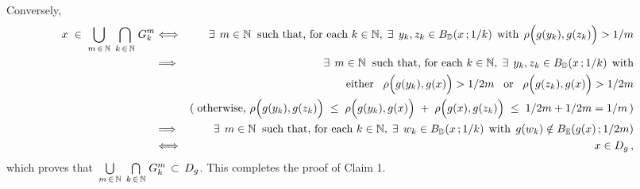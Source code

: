 \vskip 0.3cm
\noindent
Conversely,
\begin{eqnarray*}
x \;\in\; \underset{m\,\in\,\N}{\bigcup}\;\, \underset{k\,\in\,\N}{\bigcap}\; G^{m}_{k}
&\Longleftrightarrow&
	\exists\;\,m \in \N \;\;\textnormal{such that, for each $k \in \N$},\;
	\exists\;\, y_{k}, z_{k} \in B_{\D}(x\,;1/k)\;\,\textnormal{with}\;\, \rho\!\left(g(y_{k})\overset{{\color{white}\vert}}{,}\,g(z_{k})\right) > 1/m
\\
&\Longrightarrow&
	\exists\;\,m \in \N \;\;\textnormal{such that, for each $k \in \N$},\;
	\exists\;\, y_{k}, z_{k} \in B_{\D}(x\,;1/k)\;\,\textnormal{with}
\\
&&
	\textnormal{either}\;\;\;
	\rho\!\left(g(y_{k})\overset{{\color{white}\vert}}{,}\,g(x)\right) > 1/2m
	\;\;\;\textnormal{or}\;\;\;
	\rho\!\left(g(z_{k})\overset{{\color{white}\vert}}{,}\,g(x)\right) > 1/2m
\\
&&
	\textnormal{(\;otherwise,
	$\rho\!\left(g(y_{k})\overset{{\color{white}\vert}}{,}\,g(z_{k})\right)
	\;\leq\;
		\rho\!\left(g(y_{k})\overset{{\color{white}\vert}}{,}\,g(x)\right)
		\;+\;
		\rho\!\left(g(x)\overset{{\color{white}\vert}}{,}\,g(z_{k})\right)
	\;\leq\; 1/2m + 1/2m = 1/m$\,)}
\\
&\Longrightarrow&
	\exists\;\,m \in \N \;\;\textnormal{such that, for each $k \in \N$},\;
	\exists\;\, w_{k} \in B_{\D}(x\,;1/k)\;\,\textnormal{with}\;\,
	g(w_{k}) \notin B_{\mathbb{E}}(g(x)\,;1/2m)
\\
&\Longleftrightarrow&
	x \in D_{g}\,,
\end{eqnarray*}
which proves that
\,$\underset{m\,\in\,\mathbb{N}}{\bigcup}\;\, \underset{k\,\in\,\mathbb{N}}{\bigcap}\; G^{m}_{k} \,\subset\, D_{g}$.
This completes the proof of Claim 1.

